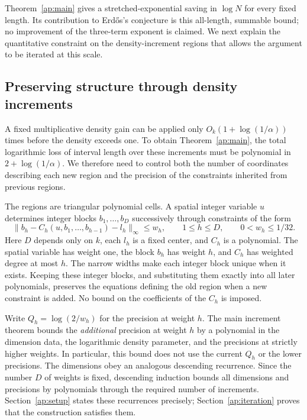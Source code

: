 Theorem~\ref{ap:main} gives a stretched-exponential saving in
$\log N$ for every fixed length. Its contribution to Erd\H{o}s's
conjecture is this all-length, summable bound; no improvement of
the three-term exponent is claimed. We next explain the
quantitative constraint on the density-increment regions that
allows the argument to be iterated at this scale.

\subsection{Preserving structure through density increments}

A fixed multiplicative density gain can be applied only
$O_k(1+\log(1/\alpha))$ times before the density exceeds one.
To obtain Theorem~\ref{ap:main}, the total logarithmic loss of
interval length over these increments must be polynomial in
$2+\log(1/\alpha)$. We therefore need to control both the number
of coordinates describing each new region and the precision of
the constraints inherited from previous regions.

The regions are triangular polynomial cells. A spatial integer
variable $u$ determines integer blocks $b_1,\ldots,b_D$
successively through constraints of the form
\[
 \|b_h-C_h(u,b_1,\ldots,b_{h-1})-l_h\|_\infty\le w_h,
 \qquad 1\le h\le D,\qquad 0<w_h\le1/32.
\]
Here $D$ depends only on $k$, each $l_h$ is a fixed center, and
$C_h$ is a polynomial. The spatial variable has weight one,
the block $b_h$ has weight $h$, and $C_h$ has weighted degree
at most $h$. The narrow widths make each integer block unique
when it exists. Keeping these integer blocks, and substituting
them exactly into all later polynomials, preserves the equations
defining the old region when a new constraint is added.
No bound on the coefficients of the $C_h$ is imposed.

Write $Q_h=\log(2/w_h)$ for the precision at weight $h$.
The main increment theorem bounds the \emph{additional}
precision at weight $h$ by a polynomial in the dimension data,
the logarithmic density parameter, and the precisions at
strictly higher weights. In particular, this bound does not use
the current $Q_h$ or the lower precisions. The dimensions obey
an analogous descending recurrence. Since the number $D$ of
weights is fixed, descending induction bounds all dimensions
and precisions by polynomials through the required number of
increments. Section~\ref{ap:setup} states these recurrences
precisely; Section~\ref{ap:iteration} proves that the construction
satisfies them.

